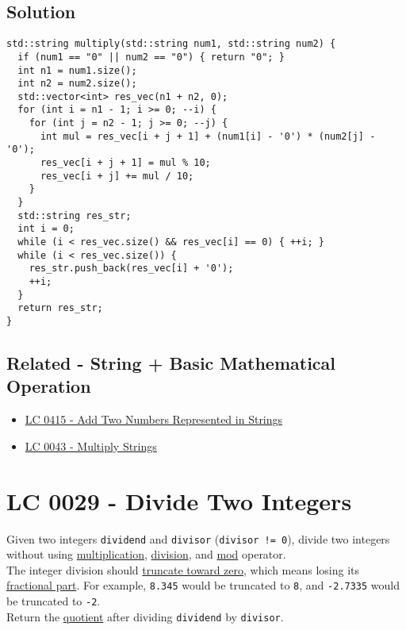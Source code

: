 \subsection*{Solution}
\begin{lstlisting}
std::string multiply(std::string num1, std::string num2) {
  if (num1 == "0" || num2 == "0") { return "0"; }
  int n1 = num1.size();
  int n2 = num2.size();
  std::vector<int> res_vec(n1 + n2, 0);
  for (int i = n1 - 1; i >= 0; --i) {
    for (int j = n2 - 1; j >= 0; --j) {
      int mul = res_vec[i + j + 1] + (num1[i] - '0') * (num2[j] - '0');
      res_vec[i + j + 1] = mul % 10;
      res_vec[i + j] += mul / 10;
    }
  }
  std::string res_str;
  int i = 0;
  while (i < res_vec.size() && res_vec[i] == 0) { ++i; }
  while (i < res_vec.size()) {
    res_str.push_back(res_vec[i] + '0');
    ++i;
  }
  return res_str;
}
\end{lstlisting}

\subsection*{Related - String + Basic Mathematical Operation}
\begin{itemize}
\item \hyperref[lc0415]{LC 0415 - Add Two Numbers Represented in Strings}
\item \hyperref[lc0043]{LC 0043 - Multiply Strings}
\end{itemize}

\section{LC 0029 - Divide Two Integers}
Given two integers {\colorbox{CodeBackground}{\lstinline|dividend|}} and {\colorbox{CodeBackground}{\lstinline|divisor|}} ({\colorbox{CodeBackground}{\lstinline|divisor != 0|}}), divide two integers without using \ul{multiplication}, \ul{division}, and \ul{mod} operator.\\

The integer division should \ul{truncate toward zero}, which means losing its \ul{fractional part}. For example, {\colorbox{CodeBackground}{\lstinline|8.345|}} would be truncated to {\colorbox{CodeBackground}{\lstinline|8|}}, and {\colorbox{CodeBackground}{\lstinline|-2.7335|}} would be truncated to {\colorbox{CodeBackground}{\lstinline|-2|}}.\\

Return the \ul{quotient} after dividing {\colorbox{CodeBackground}{\lstinline|dividend|}} by {\colorbox{CodeBackground}{\lstinline|divisor|}}.\\

